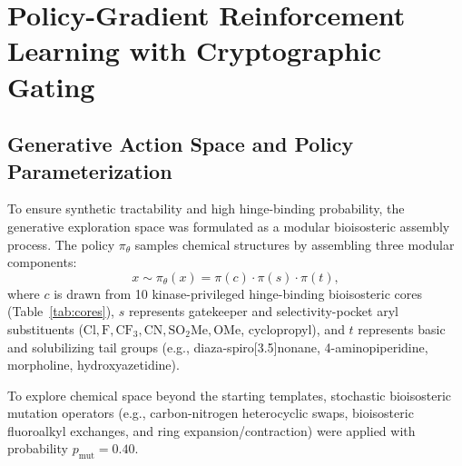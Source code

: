 \documentclass[journal]{IEEEtran}
\begin{document}
\section{Policy-Gradient Reinforcement Learning with Cryptographic Gating}

\subsection{Generative Action Space and Policy Parameterization}
To ensure synthetic tractability and high hinge-binding probability, the generative exploration space was formulated as a modular bioisosteric assembly process. The policy $\pi_\theta$ samples chemical structures by assembling three modular components:
\begin{equation}
    x \sim \pi_\theta(x) = \pi(c) \cdot \pi(s) \cdot \pi(t),
\end{equation}
where $c$ is drawn from 10 kinase-privileged hinge-binding bioisosteric cores (Table~\ref{tab:cores}), $s$ represents gatekeeper and selectivity-pocket aryl substituents ($\text{Cl}, \text{F}, \text{CF}_3, \text{CN}, \text{SO}_2\text{Me}, \text{OMe}$, cyclopropyl), and $t$ represents basic and solubilizing tail groups (e.g., diaza-spiro[3.5]nonane, 4-aminopiperidine, morpholine, hydroxyazetidine). 

To explore chemical space beyond the starting templates, stochastic bioisosteric mutation operators (e.g., carbon-nitrogen heterocyclic swaps, bioisosteric fluoroalkyl exchanges, and ring expansion/contraction) were applied with probability $p_{\text{mut}} = 0.40$.
\end{document}

